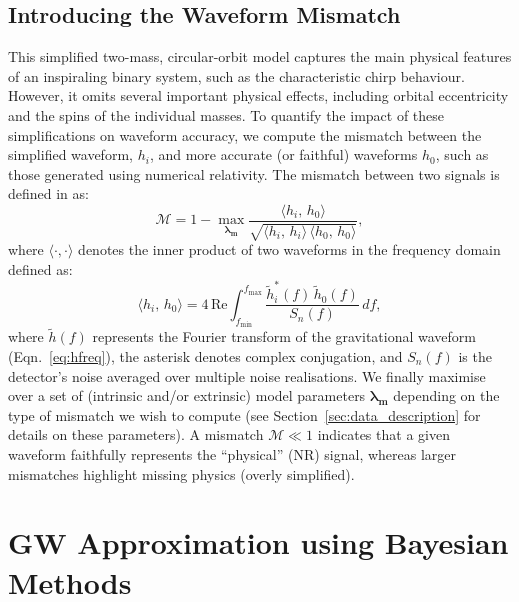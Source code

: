\documentclass{ucdgradtaughtthesis}
\begin{document}
\subsection{Introducing the Waveform Mismatch}
\label{subsec:mismatch_intro}
%
%
This simplified two-mass, circular-orbit model captures the main physical features of an inspiraling binary system, such as the characteristic chirp behaviour.
However, it omits several important physical effects, including orbital eccentricity and the spins of the individual masses. 
To quantify the impact of these simplifications on waveform accuracy, we compute the mismatch between the simplified waveform, 
\( h_i \), and more accurate (or faithful) waveforms \( h_0 \), such as those generated using numerical relativity.
The mismatch between two signals is defined in \cite{mismatch, Ogpaper} as:
%
\begin{equation}
\label{eq:mismatch_def}
\mathcal{M} = 1 - \max_{\boldsymbol{\lambda_m}}
\frac{\langle h_i,\,h_0 \rangle}{\sqrt{\langle h_i,\,h_i \rangle \,\langle h_0,\,h_0 \rangle}},
\end{equation}
%
where \( \langle \cdot, \cdot \rangle \) denotes the inner product of two waveforms in the frequency domain defined as:
%
\begin{equation}
\langle h_i,\,h_0 \rangle = 4\,\mathrm{Re} \int_{f_{\text{min}}}^{f_{\text{max}}} \frac{\tilde{h}_i^*(f)\,\tilde{h}_0(f)}{S_n(f)}\,df,
\end{equation}
%
where \( \tilde{h}(f) \) represents the Fourier transform of the gravitational waveform (Eqn.~\eqref{eq:hfreq}), the asterisk denotes complex conjugation, and \( S_n(f) \) is the detector’s noise averaged over multiple noise realisations.
We finally maximise over a set of (intrinsic and/or extrinsic) model parameters \(\mathbf{\lambda_m}\) depending on the type of mismatch we wish to compute
 (see Section~\ref{sec:data_description} for details on these parameters).
A mismatch \(\mathcal{M}\ll 1\) indicates that a given waveform
faithfully represents the ``physical'' (NR) signal, whereas larger mismatches highlight missing
physics (overly simplified).




\section{GW Approximation using Bayesian Methods}
\label{sec:GW_and_Bayes}
\end{document}
